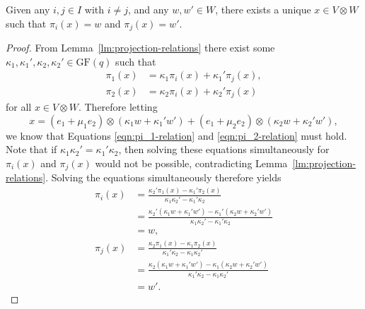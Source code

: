 \documentclass[ALCO, Unicode]{cedram}
\newcommand{\GF}{\mathrm{GF}}
\begin{document}
\begin{lemma} \label{lm:two-projections-determines-tensor}
Given any $i, j \in I$ with $i \neq j$, and any $w, w' \in W$, there exists a unique $x \in V \otimes W$ such that $\pi_i{\left(x \right)} = w$ and $\pi_j{\left(x \right)} = w'$.
\end{lemma}
\begin{proof}
From Lemma~\ref{lm:projection-relations} there exist some $\kappa_1, \kappa_1', \kappa_2, \kappa_2' \in \GF{\left(q \right)}$ such that
\begin{align}
    \pi_1{\left(x \right)} &= \kappa_1 \pi_i{\left(x \right)} + \kappa_1' \pi_j{\left(x \right)}, \label{eqn:pi_1-relation} \\
    \pi_2{\left(x \right)} &= \kappa_2 \pi_i{\left(x \right)} + \kappa_2' \pi_j{\left(x \right)} \label{eqn:pi_2-relation}
\end{align}
for all $x \in V \otimes W$. Therefore letting
\begin{displaymath}
    x = \left(e_1 + \mu_1 e_2 \right) \otimes \left(\kappa_1 w + \kappa_1' w' \right) + \left(e_1 + \mu_2 e_2 \right) \otimes {\left(\kappa_2 w + \kappa_2' w' \right)},
\end{displaymath}
we know that Equations \eqref{eqn:pi_1-relation} and \eqref{eqn:pi_2-relation} must hold. Note that if $\kappa_1 \kappa_2' = \kappa_1' \kappa_2$, then solving these equations simultaneously for $\pi_i{\left(x \right)}$ and $\pi_j{\left(x \right)}$ would not be possible, contradicting Lemma~\ref{lm:projection-relations}. Solving the equations simultaneously therefore yields
\begin{align*}
    \pi_i{\left(x \right)} &= \frac{\kappa_2' \pi_1{\left(x \right)} - \kappa_1' \pi_2{\left(x \right)}}{\kappa_1 \kappa_2' - \kappa_1' \kappa_2} \\
    &= \frac{\kappa_2' \left(\kappa_1 w + \kappa_1' w' \right) - \kappa_1' \left(\kappa_2 w + \kappa_2' w' \right)}{\kappa_1 \kappa_2' - \kappa_1' \kappa_2} \\
    &= w, \\
    \pi_j{\left(x \right)} &= \frac{\kappa_2 \pi_1{\left(x \right)} - \kappa_1 \pi_2{\left(x \right)}}{\kappa_1' \kappa_2 - \kappa_1 \kappa_2'} \\
    &= \frac{\kappa_2 \left(\kappa_1 w + \kappa_1' w' \right) - \kappa_1 \left(\kappa_2 w + \kappa_2' w' \right)}{\kappa_1' \kappa_2 - \kappa_1 \kappa_2'} \\
    &= w'.
\end{align*}


\end{proof}
\end{document}
